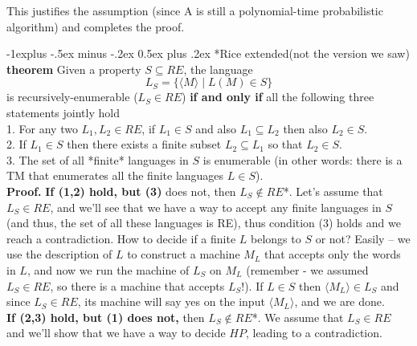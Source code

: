 \documentclass[10pt,landscape]{article}
\makeatletter
\theoremstyle{plain}%
\newtheorem*{thm}{Theorem}
\theoremstyle{definition}
\theoremstyle{remark}
\renewcommand{\subsection}{\@startsection{subsection}{2}{0mm}%
                                {-1explus -.5ex minus -.2ex}%
                                {0.5ex plus .2ex}%
                                {\normalfont\normalsize\bfseries}}
\makeatother
\begin{document}
\begin{multicols}{3}
This justifies the assumption (since A is still a polynomial-time probabilistic algorithm) and completes the proof.


\setlength{\premulticols}{1pt}
\setlength{\postmulticols}{1pt}
\setlength{\multicolsep}{1pt}
\setlength{\columnsep}{2pt}
\subsection*{Rice extended(not the version we saw)}
\textbf{theorem}
 Given a property $S \subseteq RE$, the  language 
 $$ L_S = \{ \langle M \rangle \mid L(M) \in S  \} $$
is recursively-enumerable ($L_S \in RE$) \textbf{if and only if} all the following three statements jointly hold
\\ 1. For any two $L_1, L_2 \in RE$, if $L_1 \in S$ and also $L_1 \subseteq L_2$ then also $L_2 \in S$.
\\2. If $L_1\in S$ then there exists a finite subset $L_2 \subseteq L_1$ so that $L_2 \in S$.
\\3. The set of all *finite* languages in $S$ is enumerable (in other words: there is a TM that enumerates all the finite languages $L\in S$).\\
\textbf{
Proof. }  
\textbf{If (1,2) hold, but (3)} does not, then $L_S \notin RE$*.  
Let's assume that $L_S \in RE$, and we'll see that we have a way to accept any finite languages in $S$ (and thus, the set of all these languages is RE), thus condition (3) holds and we reach a contradiction. How to decide if a finite $L$ belongs to $S$ or not? Easily – we use the description of $L$ to construct a machine $M_L$ that accepts only the words in $L$, and now we run the machine of $L_S$ on $M_L$ (remember - we assumed $L_S\in RE$, so there is a machine that accepts $L_S$!). If $L\in S$ then $\langle M_L \rangle \in L_S$ and since $L_S\in RE$, its machine will say yes on the input $\langle M_L \rangle$, and we are done. 
\\
\textbf{If (2,3) hold, but (1) does not,} then $L_S \notin RE$*.  
We assume that $L_S \in RE$ and we'll show that we have a way to decide $HP$, leading to a contradiction.


\end{multicols}
\end{document}
